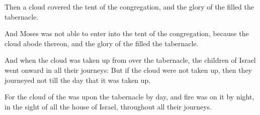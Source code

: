 \verse Then a cloud covered the tent of the congregation, and the glory of the \LORD filled the tabernacle.

\verse And Moses was not able to enter into the tent of the congregation, because the cloud abode thereon, and the glory of the \LORD filled the tabernacle.

\verse And when the cloud was taken up from over the tabernacle, the children of Israel went onward in all their journeys: \verse But if the cloud were not taken up, then they journeyed not till the day that it was taken up.

\verse For the cloud of the \LORD was upon the tabernacle by day, and fire was on it by night, in the sight of all the house of Israel, throughout all their journeys.

